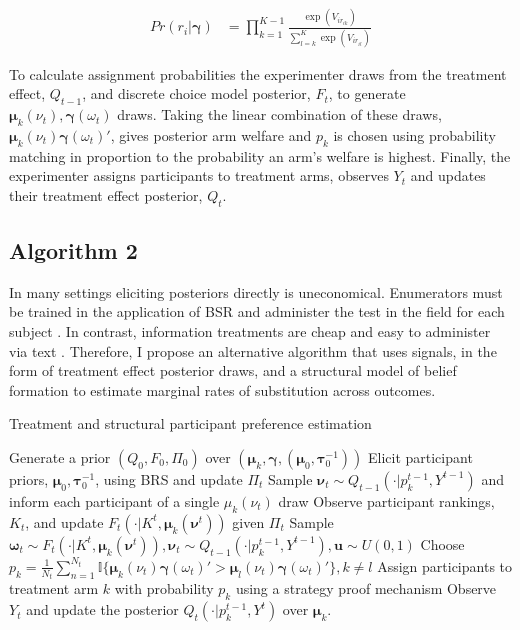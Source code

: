 \documentclass[twoside,11pt]{article}
\begin{document}
\begin{align*}
  Pr(r_i | \bm{\gamma}) &= \prod^{K-1}_{k=1} \frac{\exp(V_{ir_{ik}})}{\sum^K_{l=k}\exp(V_{ir_{il}})}
\end{align*}


To calculate assignment probabilities the experimenter draws from the treatment
effect, $Q_{t-1}$, and discrete choice model posterior, $F_t$, to generate $\bm{\mu}_k(\nu_t), \bm{\gamma}(\omega_t)$ 
draws. Taking the linear combination of these draws, 
$\bm{\mu}_k(\nu_{t}) \bm{\gamma}(\omega_{t})'$, gives posterior arm welfare and 
$p_k$ is chosen using probability matching in proportion to the probability an 
arm's welfare is highest. Finally, the experimenter assigns participants to 
treatment arms, observes $Y_t$ and updates their treatment effect posterior, $Q_t$.

\subsection{Algorithm 2}
In many settings eliciting posteriors directly is uneconomical. Enumerators must 
be trained in the application of BSR and administer the test in the field for 
each subject \citep{glennerster}. In contrast, information treatments are cheap and easy to administer 
via text \citep{banerjee2021a}. Therefore, I propose an alternative algorithm that uses signals, 
in the form of treatment effect posterior draws, 
and a structural model of belief formation to estimate marginal rates of 
substitution across outcomes.

\begin{algorithm}
  \caption{Treatment and structural participant preference estimation }\label{alg:cap}
  \begin{algorithmic}
  \State Generate a prior $(Q_0, F_0, \Pi_0)$ over $\left(\bm{\mu}_k, \bm{\gamma}, (\bm{\mu}_0, \bm{\tau}_0^{-1})\right)$
  \State Elicit participant priors, $\bm{\mu}_0, \bm{\tau}_0^{-1}$, using BRS and update $\Pi_t$
  \EndIf
  \State Sample $\bm{\nu}_{t} \sim Q_{t-1}(\cdot | p_{k}^{t-1}, Y^{t-1})$ and inform each 
  participant of a single $\mu_k(\nu_{t})$ draw
  \State Observe participant rankings, $K_t$, and update $F_{t}( \cdot | K^{t}, \bm{\mu}_k(\bm{\nu}^{t}))$ 
  given $\Pi_t$
  \State Sample $\bm{\omega}_{t} \sim F_{t}( \cdot | K^{t}, \bm{\mu}_k(\bm{\nu}^{t})), \bm{\nu}_t \sim Q_{t-1}(\cdot | p_{k}^{t-1}, Y^{t-1}), \bm{u} \sim U(0,1)$ 
  \State Choose $p_k = \frac{1}{N_t} 
  \sum^{N_t}_{n=1} \mathbb{I}\{\bm{\mu}_k(\nu_{t}) \bm{\gamma}(\omega_{t})' > \bm{\mu}_l(\nu_{t}) \bm{\gamma}(\omega_{t})'\}, k \neq l$ 
  \State Assign participants to treatment arm $k$ with probability $p_{k}$ using a strategy proof mechanism
  \State Observe $Y_t$ and update the posterior $Q_{t}(\cdot | p_k^{t-1}, Y^{t})$ over $\bm{\mu}_k$. 
  \EndFor
  \end{algorithmic}
  \end{algorithm}
\end{document}
